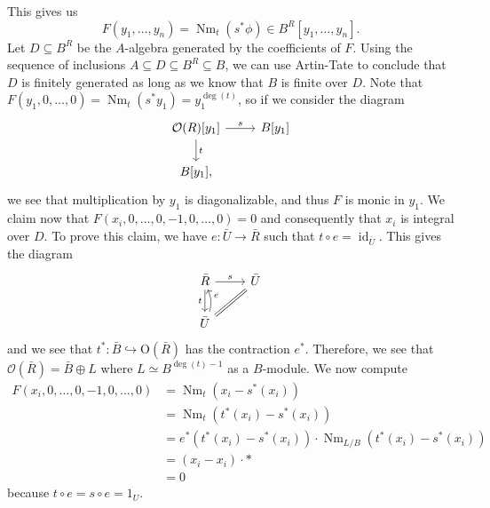\documentclass{amsart}
\theoremstyle{definition}
\theoremstyle{remark}
\theoremstyle{plain}
\theoremstyle{definition}
\theoremstyle{remark}
\newcommand{\mc}[1]{\mathcal{#1}}
\newcommand{\mr}[1]{\mathrm{#1}}
\newcommand{\on}[1]{\operatorname{#1}}
\newcommand{\1}{\mathbf{1}}
\newcommand{\2}{\mathbf{2}}
\newcommand{\3}{\mathbf{3}}
\begin{document}
    This gives us
    \[ F(y_1, \ldots, y_n) = \on{Nm}_t(s^* \phi) \in B^R[y_1, \ldots, y_n]. \]
    Let \(D \subseteq B^R\) be the \(A\)-algebra generated by the coefficients of \(F\). Using the sequence of inclusions \(A \subseteq D \subseteq B^R \subseteq B\), we can use Artin-Tate to conclude that \(D\) is finitely generated as long as we know that \(B\) is finite over \(D\). Note that \(F(y_1, 0, \ldots, 0) = \on{Nm}_t (s^* y_1) = y_1^{\deg(t)}\), so if we consider the diagram
    \begin{equation*}
    \begin{tikzcd}
        {\mc{O}(R)[y_1]} \ar{r}{s} \ar{d}{t} & {B[y_1]} \\
        {B[y_1]},
    \end{tikzcd}
    \end{equation*}
    we see that multiplication by \(y_1\) is diagonalizable, and thus \(F\) is monic in \(y_1\). We claim now that \(F(x_i, 0, \ldots, 0, -1, 0, \ldots, 0) = 0\) and consequently that \(x_i\) is integral over \(D\). To prove this claim, we have \(e \colon \bar{U} \to \bar{R}\) such that \(t \circ e = \on{id}_{\bar{U}}\). This gives the diagram
    \begin{equation*}
    \begin{tikzcd}
        \bar{R} \ar{r}{s} \ar{d}[swap]{t} & \bar{U} \ar[equals]{dl} \\
        \bar{U} \ar[bend right=20]{u}[swap]{e}
    \end{tikzcd}
    \end{equation*}
    and we see that \(t^* \colon \bar{B} \hookrightarrow \mr{O}(\bar{R})\) has the contraction \(e^*\). Therefore, we see that \(\mc{O}(\bar{R}) = \bar{B} \oplus L\) where \(L \simeq B^{\deg(t)-1}\) as a \(B\)-module. We now compute
    \begin{align*}
        F(x_i, 0, \ldots, 0, -1, 0, \ldots, 0) &= \on{Nm}_t(x_i - s^*(x_i)) \\
        &= \on{Nm}_t (t^*(x_i) - s^*(x_i)) \\
        &= e^* (t^* (x_i) - s^*(x_i)) \cdot \on{Nm}_{L/B} (t^*(x_i) - s^*(x_i))\\
        &= (x_i - x_i) \cdot * \\
        &= 0
    \end{align*}
    because \(t \circ e = s \circ e = 1_U\).
\end{document}

